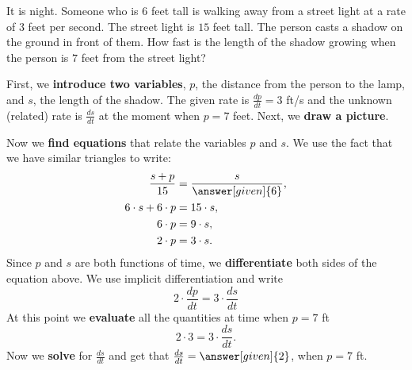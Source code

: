 \documentclass{ximera}
\begin{document}
\begin{example}
  It is night. Someone who is $6$ feet tall is walking away from a
  street light at a rate of $3$ feet per second.  The street light is
  $15$ feet tall.  The person casts a shadow on the ground in front of
  them. How fast is the length of the shadow growing when the person
  is $7$ feet from the street light?

  \begin{explanation}
  First, we \textbf{introduce two variables}, $p$, the distance from the person to the lamp, and  $s$, the length of the shadow.
  The given rate is $\frac{dp}{dt}=3$ ft/s and the unknown (related) rate is $\frac{ds}{dt}$ at the moment when $p=7$ feet.
    Next, we \textbf{draw a picture}.
    \begin{image}
    \end{image}

    Now we \textbf{find equations} that relate the variables $p$ and $s$. We use the fact that we
    have similar triangles to write:
    \begin{align*}
      \frac{s+p}{15} &= \frac{s}{\answer[given]{6}},\\
      6\cdot s + 6 \cdot p &= 15\cdot s,\\
      6\cdot p &=9\cdot s,\\
      2\cdot p &=3 \cdot s. 
    \end{align*}
    Since $p$ and $s$ are both functions of time, we 
  \textbf{differentiate} both sides of the equation above. We  use
    implicit differentiation and write
        \[
    2\cdot \frac{dp}{dt} =3 \cdot \frac{ds}{dt}
    \]
    At this point we \textbf{evaluate} all the quantities at time when $p=7$ ft 
    \[
    2\cdot 3 = 3 \cdot \frac{ds}{dt}.
    \]
    Now we \textbf{solve} for  $\frac{ds}{dt}$ and get that
     $\frac{ds}{dt}= \answer[given]{2}$, when $p=7$ ft.
     

\end{explanation}
\end{example}
\end{document}
